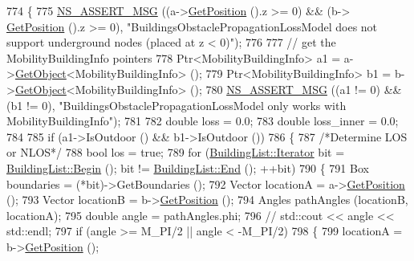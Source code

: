 \begin{DoxyCode}
774         \{
775         \hyperlink{assert_8h_aff5ece9066c74e681e74999856f08539}{NS\_ASSERT\_MSG} ((a->\hyperlink{classns3_1_1MobilityModel_aba838f06ec5bbb2d193d94b8c0e4abb4}{GetPosition} ().z >= 0) && (b->
      \hyperlink{classns3_1_1MobilityModel_aba838f06ec5bbb2d193d94b8c0e4abb4}{GetPosition} ().z >= 0), \textcolor{stringliteral}{"BuildingsObstaclePropagationLossModel does not support underground
       nodes (placed at z < 0)"});
776 
777         \textcolor{comment}{// get the MobilityBuildingInfo pointers}
778         Ptr<MobilityBuildingInfo> a1 = a->\hyperlink{classns3_1_1Object_a13e18c00017096c8381eb651d5bd0783}{GetObject}<MobilityBuildingInfo> ();
779         Ptr<MobilityBuildingInfo> b1 = b->\hyperlink{classns3_1_1Object_a13e18c00017096c8381eb651d5bd0783}{GetObject}<MobilityBuildingInfo> ();
780         \hyperlink{assert_8h_aff5ece9066c74e681e74999856f08539}{NS\_ASSERT\_MSG} ((a1 != 0) && (b1 != 0), \textcolor{stringliteral}{"BuildingsObstaclePropagationLossModel only
       works with MobilityBuildingInfo"});
781 
782         \textcolor{keywordtype}{double} loss = 0.0;
783         \textcolor{keywordtype}{double} loss\_inner = 0.0;
784 
785         \textcolor{keywordflow}{if} (a1->IsOutdoor () && b1->IsOutdoor ())
786         \{
787                 \textcolor{comment}{/*Determine LOS or NLOS*/}
788                 \textcolor{keywordtype}{bool} los = \textcolor{keyword}{true};
789                 \textcolor{keywordflow}{for} (\hyperlink{classns3_1_1BuildingList_a84957ecea4b4343f676da0e96f2c8130}{BuildingList::Iterator} bit = 
      \hyperlink{classns3_1_1BuildingList_adbb122872e11541e930f0a3afa70a479}{BuildingList::Begin} (); bit != \hyperlink{classns3_1_1BuildingList_abc6b941dbb194efb9f00352cc6b3db65}{BuildingList::End} (); ++bit)
790                 \{
791                         Box boundaries = (*bit)->GetBoundaries ();
792                         Vector locationA = a->\hyperlink{classns3_1_1MobilityModel_aba838f06ec5bbb2d193d94b8c0e4abb4}{GetPosition} ();
793                         Vector locationB = b->\hyperlink{classns3_1_1MobilityModel_aba838f06ec5bbb2d193d94b8c0e4abb4}{GetPosition} ();
794                         Angles pathAngles (locationB, locationA);
795                         \textcolor{keywordtype}{double} angle = pathAngles.phi;
796                 \textcolor{comment}{//      std::cout << angle << std::endl;}
797                         \textcolor{keywordflow}{if} (angle >= M\_PI/2 || angle < -M\_PI/2)
798                         \{
799                                 locationA = b->\hyperlink{classns3_1_1MobilityModel_aba838f06ec5bbb2d193d94b8c0e4abb4}{GetPosition} ();

\end{DoxyCode}
